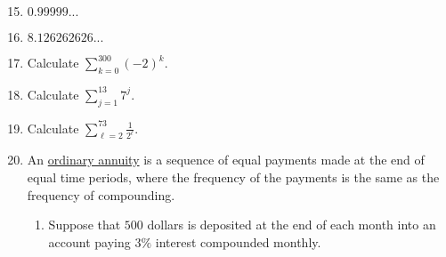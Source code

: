\documentclass[12pt]{article}
\newif\ifans
\begin{document}

\begin{enumerate}
\setcounter{enumi}{14}

\item $0.99999...$

\ifans{\fbox{$0.99999...=0.9+0.09+0.009+\ldots=\sum_{k=0}^{\infty}0.9\left(\frac{1}{10}\right)^k=\frac{\frac{9}{10}}{1-\frac{1}{10}}=1$}} \fi

\item $8.126262626...$

\ifans{\fbox{\parbox{1\linewidth}
{\begin{flalign*}8.126262626...&=8.1+0.026+0.00026+0.0000026+\ldots & \\
&=8.1+\sum_{k=0}^{\infty}0.026\left(\frac{1}{100}\right)^k & \\
&=8.1+\frac{\frac{26}{1000}}{1-\frac{1}{100}}=\frac{81}{10}+\frac{26}{990}=\frac{8045}{990}=\frac{1609}{198}
\end{flalign*}}}} \fi

\item Calculate $\sum_{k=0}^{300}(-2)^{k}.$

\ifans{\fbox{$\frac{1-(-2)^{301}}{3}=\frac{1+2^{301}}{3}$ }} \fi

\item Calculate $\sum_{j=1}^{13}7^{j}.$

\ifans{\fbox{$-\frac{7}{6}\left(1-7^{13}\right)$; Detailed Solution: \textcolor{blue}{\href{http://www.math.drexel.edu/classes/Calculus/resources/Math123HW/Solutions/123_07_Series_18.pdf}{Here}}}} \fi

\item Calculate $\sum_{\ell=2}^{73}\frac{1}{2^{\ell}}.$

\ifans{\fbox{$\frac{1}{2}\left(1-\frac{1}{2^{72}}\right)$ }} \fi

\item An \underline{ordinary annuity} is a sequence of equal payments made at the end of equal time periods, where the frequency of the payments is the same as the frequency of compounding.  
\begin{enumerate}

\item Suppose that $500$ dollars is deposited at the end of each month into an account paying $3\%$ interest compounded monthly.

\begin{enumerate}


\end{enumerate}
\end{enumerate}
\end{enumerate}
\end{document}
